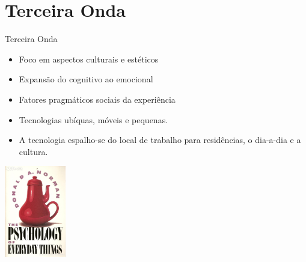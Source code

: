 \section{Terceira Onda}

\begin{frame}[t, fragile]{Terceira Onda}
    \begin{itemize}
    	\item Foco em aspectos culturais e estéticos
    	\item Expansão do cognitivo ao \alert{emocional}
    	\item Fatores pragmáticos \alert{sociais} da experiência 
    	\item Tecnologias \alert{ubíquas}, móveis e pequenas.
		\item A tecnologia espalho-se do local de \alert{trabalho} para \alert{residências}, o dia-a-dia e a cultura.
    \end{itemize}   
     \begin{flushright}
     	\includegraphics[width=0.20\textwidth]{imagens/terceira-onda}
     \end{flushright}
\end{frame}